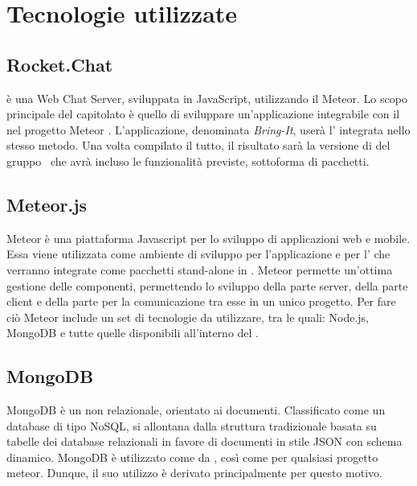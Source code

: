 \section{Tecnologie utilizzate}

\subsection{Rocket.Chat}
 è una Web Chat Server, sviluppata in JavaScript, utilizzando il  Meteor. Lo scopo principale del capitolato è quello di sviluppare un'applicazione integrabile con il   nel progetto Meteor . L'applicazione, denominata \textit{Bring-It}, userà l' integrata nello stesso metodo. Una volta compilato il tutto, il risultato sarà la versione di  del gruppo \gruppo\ che avrà incluso le funzionalità previste, sottoforma di pacchetti.

\subsection{Meteor.js}
Meteor è una piattaforma Javascript per lo sviluppo di applicazioni web e mobile. Essa viene utilizzata come ambiente di sviluppo per l'applicazione e per l' che verranno integrate come pacchetti stand-alone in .
Meteor permette un'ottima gestione delle componenti, permettendo lo sviluppo della parte server, della parte client e della parte per la comunicazione tra esse in un unico progetto. Per fare ciò Meteor include un set di tecnologie da utilizzare, tra le quali: Node.js, MongoDB e tutte quelle disponibili all'interno del  .

\subsection{MongoDB}
MongoDB è un  non relazionale, orientato ai documenti. Classificato come un database di tipo NoSQL, si allontana dalla
struttura tradizionale basata su tabelle dei database relazionali in favore di documenti in stile
JSON con schema dinamico. MongoDB è utilizzato come  da , così come per qualsiasi progetto meteor. Dunque, il suo utilizzo è derivato principalmente per questo motivo.

